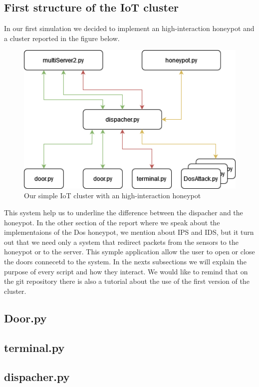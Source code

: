 \subsection{ First structure of the IoT cluster}
In our first simulation we decided to implement an high-interaction honeypot and a cluster reported in the figure below.
\begin{figure}[h!]
  \centering
  \includegraphics[width = 12cm]{images/HighInterationHoneypot.drawio.png}
  \caption{Our simple IoT cluster with an high-interaction honeypot}
  \label{fig:DosImpl1}
\end{figure}
\FloatBarrier
\noindent
This system help us to underline the difference between the dispacher and the honeypot. In the other section of the report 
where we speak about the implementaions of the Dos honeypot, we mention about IPS and IDS, but it turn out that we need only a system that redirect packets
from the sensors to the honeypot or to the server.  This symple application allow the user to open or close the doors connecetd to the system.
In the nexts subsections we will explain the purpose of every script and how they interact. We would like to remind that on the git repository there is also a tutorial about the use of the first version of the cluster.
\subsection{Door.py}


\subsection{terminal.py}

\subsection{dispacher.py}

